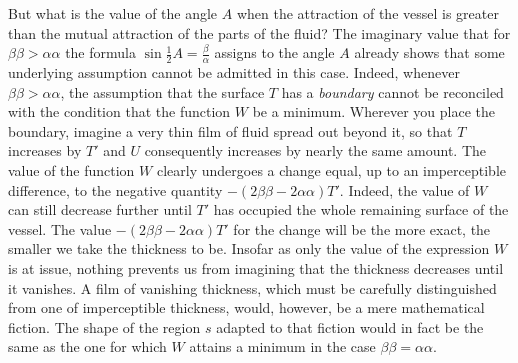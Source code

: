 But what is the value of the angle $A$ when the attraction of the vessel is greater than the mutual attraction of the parts of the fluid? The imaginary value that for $\beta\beta>\alpha\alpha$ the formula $\sin\frac12 A=\frac\beta\alpha$ assigns to the angle $A$ already shows that some underlying assumption cannot be admitted in this case. Indeed, whenever $\beta\beta>\alpha\alpha$, the assumption that the surface $T$ has a \textit{boundary} cannot be reconciled with the condition that the function $W$ be a minimum. Wherever you place the boundary, imagine a very thin film of fluid spread out beyond it, so that $T$ increases by $T'$ and $U$ consequently increases by nearly the same amount. The value of the function $W$ clearly undergoes a change equal, up to an imperceptible difference, to the negative quantity $-(2\beta\beta-2\alpha\alpha)T'$. Indeed, the value of $W$ can still decrease further until $T'$ has occupied the whole remaining surface of the vessel. The value $-(2\beta\beta-2\alpha\alpha)T'$ for the change will be the more exact, the smaller we take the thickness to be. Insofar as only the value of the expression $W$ is at issue, nothing prevents us from imagining that the thickness decreases until it vanishes. A film of vanishing thickness, which must be carefully distinguished from one of imperceptible thickness, would, however, be a mere mathematical fiction. The shape of the region $s$ adapted to that fiction would in fact be the same as the one for which $W$ attains a minimum in the case $\beta\beta=\alpha\alpha$.


